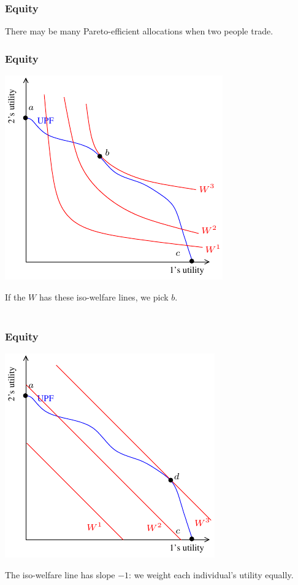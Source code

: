 \documentclass[xcolor=pdftex,dvipsnames]{beamer}
\begin{document}
\begin{frame}
  \frametitle{Equity}
  There may be many Pareto-efficient allocations when two people
  trade.


\bigskip
{}

\bigskip
{}
\bigskip

\end{frame}



\begin{frame}
  \frametitle{Equity}
  \begin{center}
    \includegraphics{pics/UPF1}
  \end{center}
If the $W$ has these iso-welfare lines, we pick $b$.\\
\
\end{frame}

\begin{frame}
  \frametitle{Equity}
  \begin{center}
    \includegraphics{pics/UPF2}
  \end{center}
The iso-welfare line has slope $-1$: we weight each individual's
utility equally.
\end{frame}
\end{document}
